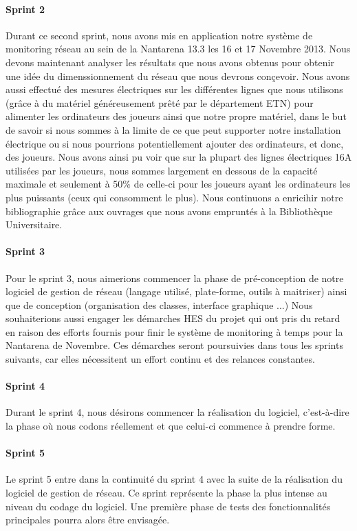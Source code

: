 \documentclass[french]{article}
\begin{document}
\paragraph{Sprint 2}
Durant ce second sprint, nous avons mis en application notre système de monitoring réseau au sein de la Nantarena 13.3 les 16 et 17 Novembre 2013. Nous devons maintenant analyser les résultats que nous avons obtenus pour obtenir une idée du dimenssionnement du réseau que nous devrons conçevoir. Nous avons aussi effectué des mesures électriques sur les différentes lignes que nous utilisons (grâce à du matériel généreusement prêté par le département ETN) pour alimenter les ordinateurs des joueurs ainsi que notre propre matériel, dans le but de savoir si nous sommes à la limite de ce que peut supporter notre installation électrique ou si nous pourrions potentiellement ajouter des ordinateurs, et donc, des joueurs.
Nous avons ainsi pu voir que sur la plupart des lignes électriques 16A utilisées par les joueurs, nous sommes largement en dessous de la capacité maximale et seulement à 50\% de celle-ci pour les joueurs ayant les ordinateurs les plus puissants (ceux qui consomment le plus).
Nous continuons a enricihir notre bibliographie grâce aux ouvrages que nous avons empruntés à la Bibliothèque Universitaire.

\paragraph{Sprint 3}
Pour le sprint 3, nous aimerions commencer la phase de pré-conception de notre logiciel de gestion de réseau (langage utilisé, plate-forme, outils à maitriser) ainsi que de conception (organisation des classes, interface graphique ...)
Nous souhaiterions aussi engager les démarches HES du projet qui ont pris du retard en raison des efforts fournis pour finir le système de monitoring à temps pour la Nantarena de Novembre. Ces démarches seront poursuivies dans tous les sprints suivants, car elles nécessitent un effort continu et des relances constantes.

\paragraph{Sprint 4}
Durant le sprint 4, nous désirons commencer la réalisation du logiciel, c'est-à-dire la phase où nous codons réellement et que celui-ci commence à prendre forme.

\paragraph{Sprint 5}
Le sprint 5 entre dans la continuité du sprint 4 avec la suite de la réalisation du logiciel de gestion de réseau. 
Ce sprint représente la phase la plus intense au niveau du codage du logiciel.
Une première phase de tests des fonctionnalités principales pourra alors être envisagée.
\end{document}

